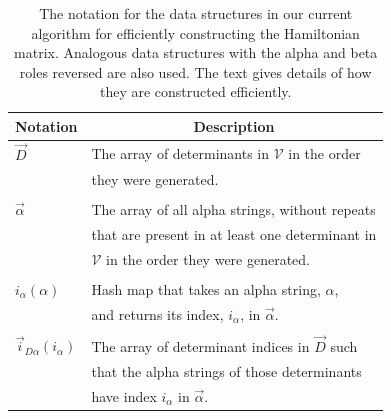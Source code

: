\documentclass[%
preprint,
 superscriptaddress,
 amsmath,amssymb,
 aps,
]{revtex4-1}
\def\V{\mathcal{V}}
\def\vecD{\vec{D}}
\def\veca{\vec{\alpha}}
\def\ia{i_\alpha}
\def\veciDa{\vec{i}_{D\alpha}}
\begin{document}
\begin{table}[h]
\caption{The notation for the data structures in our current algorithm for efficiently constructing the Hamiltonian matrix.
Analogous data structures with the alpha and beta roles reversed are also used.
The text gives details of how they are constructed efficiently.}
\begin{tabular}{ll}
\hline
\hline
Notation& \multicolumn{1}{c}{Description}\\
\hline
$\vecD$ & The array of determinants in $\V$ in the order\\
& they were generated. \\
&\\
$\veca$ & The array of all alpha strings, without repeats\\
& that are present in at least one determinant in\\
& $\V$ in the order they were generated. \\
&\\
$\ia(\alpha)$ & Hash map that takes an alpha string, $\alpha$, \\
& and returns its index, $\ia$, in $\veca$. \\
&\\
$\veciDa(\ia)$ & The array of determinant indices in $\vecD$ such\\
& that the alpha strings of those determinants \\
& have index $\ia$ in $\veca$. \\

\end{tabular}
\end{table}
\end{document}
